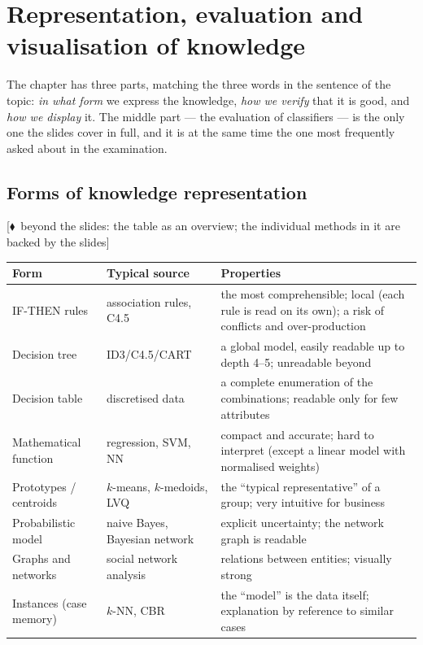 \documentclass[11pt,a4paper]{article}
\theoremstyle{definition}
\providecommand{\uv}[1]{``#1''}
\newcommand{\mimoq}[1]{\textcolor{markcol}{\textsf{\footnotesize[$\blacklozenge$~beyond the slides: #1]}}}
\begin{document}
\newpage
\section{Representation, evaluation and visualisation of knowledge}
\label{sec:reprez}

The chapter has three parts, matching the three words in the sentence of the topic: \emph{in what
form} we express the knowledge, \emph{how we verify} that it is good, and \emph{how we display} it.
The middle part --- the evaluation of classifiers --- is the only one the slides cover in full,
and it is at the same time the one most frequently asked about in the examination.

\subsection{Forms of knowledge representation}

\mimoq{the table as an overview; the individual methods in it are backed by the slides}
\begin{center}
\small
\begin{tabular}{@{}p{3.4cm}p{4.4cm}p{7.0cm}@{}}
\toprule
\textbf{Form} & \textbf{Typical source} & \textbf{Properties} \\
\midrule
IF-THEN rules & association rules, C4.5 & the most comprehensible; local (each rule is read on its
  own); a risk of conflicts and over-production \\
Decision tree & ID3/C4.5/CART & a global model, easily readable up to depth 4--5; unreadable
  beyond \\
Decision table & discretised data & a complete enumeration of the combinations; readable only for
  few attributes \\
Mathematical function & regression, SVM, NN & compact and accurate; hard to interpret (except a
  linear model with normalised weights) \\
Prototypes / centroids & $k$-means, $k$-medoids, LVQ & the \uv{typical representative} of a group;
  very intuitive for business \\
Probabilistic model & naive Bayes, Bayesian network & explicit uncertainty; the network graph is
  readable \\
Graphs and networks & social network analysis & relations between entities; visually strong \\
Instances (case memory) & $k$-NN, CBR & the \uv{model} is the data itself; explanation by reference
  to similar cases \\
\bottomrule
\end{tabular}
\end{center}
\end{document}
